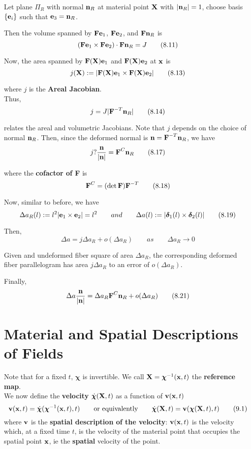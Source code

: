 \documentclass{article}
\newcommand{\Chi}{\boldsymbol{\chi}}
\begin{document}
Let plane $\Pi_R$ with normal $\textbf{n}_R$ at material point $\textbf{X}$ with $|\textbf{n}_R| = 1$, choose basis $\lbrace \textbf{e}_i \rbrace$ such that $\textbf{e}_3 = \textbf{n}_R$.

Then the volume spanned by $\textbf{F}\textbf{e}_1$, $\textbf{F}\textbf{e}_2$, and $\textbf{F}\textbf{n}_R$ is
\[
	(\textbf{F}\textbf{e}_1\times\textbf{F}\textbf{e}_2)\cdot\textbf{F}\textbf{n}_R = J \tag{8.11}\label{eq:8.11}
\]

Now, the area spanned by $\textbf{F}(\textbf{X})\textbf{e}_1$ and $\textbf{F}(\textbf{X})\textbf{e}_2$ at $\textbf{x}$ is
\[
	j(\textbf{X}):= |\textbf{F}(\textbf{X})\textbf{e}_1\times\textbf{F}(\textbf{X})\textbf{e}_2|\tag{8.13}\label{eq:8.13}	 
\]

where $j$ is the \textbf{Areal Jacobian}.\\

Thus,
\[
	j = J|\textbf{F}^{-T}\textbf{n}_R|\tag{8.14}\label{eq:8.14}
\]

relates the areal and volumetric Jacobians. Note that $j$ depends on the choice of normal $\textbf{n}_R$.
Then, since the deformed normal is $\textbf{n} = \textbf{F}^{-T}\textbf{n}_R$, we have
\[
	j?\frac{\textbf{n}}{|\textbf{n}|}=\textbf{F}^C\textbf{n}_R\tag{8.17}\label{eq:8.17}
\]

where the \textbf{cofactor of F} is
\[
	\textbf{F}^C = (\det\textbf{F})\textbf{F}^{-T}\tag{8.18}\label{eq:8.18}
\]

Now, similar to before, we have
\[
	\Delta a_R(l) := l^2|\textbf{e}_1\times\textbf{e}_2| = l^2 \qquad and \qquad \Delta a(l) := |\boldsymbol{\delta}_1(l)\times\boldsymbol{\delta}_2(l)| \tag{8.19} 
\]

Then,
\[
	\Delta a = j\Delta a_R + o(\Delta a_R) \qquad as \qquad \Delta a_R \to 0\tag{8.20}
\]
\begin{remark}
	Given and undeformed fiber square of area $\Delta a_R$, the corresponding deformed fiber parallelogram has area $j\Delta a_R$ to an error of $o(\Delta a_R)$.
\end{remark}
Finally,
\[
	\Delta a\frac{\textbf{n}}{|\textbf{n}|} = \Delta a_R\textbf{F}^C\textbf{n}_R + o(\Delta a_R)\tag{8.21}
\]


\section{Material and Spatial Descriptions of Fields}
Note that for a fixed $t$, $\Chi$ is invertible. We call $\X = \Chi^{-1}(\x,t)$ the \textbf{reference map}.\\

We now define the \textbf{velocity} $\dot{\Chi}(\X,t)$ as a function of $\textbf{v}(\textbf{x},t)$
\[
	\v(\x,t)=\dot{\Chi}(\Chi^{-1}(\x,t),t) \qquad \text{or equivalently}\qquad \dot{\Chi}(\X,t) = \v(\Chi(\X,t),t)  \tag{9.1}
\]
where $\textbf{v}$ is the \textbf{spatial description of the velocity}: $\textbf{v}(\textbf{x},t)$ is the velocity which, at a fixed time $t$, is the velocity of the material point that occupies the spatial point $\textbf{x}$, ie the \textbf{spatial} velocity of the point.
\end{document}
